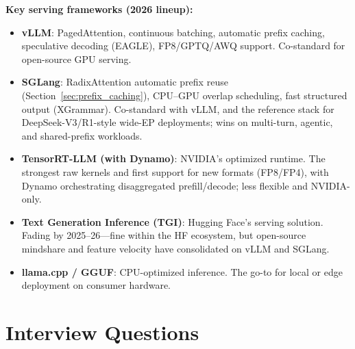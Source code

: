 \textbf{Key serving frameworks (2026 lineup):}
\begin{itemize}
    \item \textbf{vLLM}: PagedAttention, continuous batching, automatic prefix caching, speculative decoding (EAGLE), FP8/GPTQ/AWQ support. Co-standard for open-source GPU serving.
    \item \textbf{SGLang}: RadixAttention automatic prefix reuse (Section~\ref{sec:prefix_caching}), CPU--GPU overlap scheduling, fast structured output (XGrammar). Co-standard with vLLM, and the reference stack for DeepSeek-V3/R1-style wide-EP deployments; wins on multi-turn, agentic, and shared-prefix workloads.
    \item \textbf{TensorRT-LLM (with Dynamo)}: NVIDIA's optimized runtime. The strongest raw kernels and first support for new formats (FP8/FP4), with Dynamo orchestrating disaggregated prefill/decode; less flexible and NVIDIA-only.
    \item \textbf{Text Generation Inference (TGI)}: Hugging Face's serving solution. Fading by 2025--26---fine within the HF ecosystem, but open-source mindshare and feature velocity have consolidated on vLLM and SGLang.
    \item \textbf{llama.cpp / GGUF}: CPU-optimized inference. The go-to for local or edge deployment on consumer hardware.
\end{itemize}

\section{Interview Questions}
\label{sec:inference_interview}


